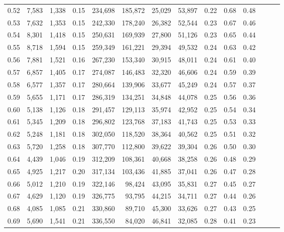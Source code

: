 \begin{tabular}{rrrrrrrrrrrrrr}
0.52 &   7,583 &  1,338 &  0.15 &  234,698 &  185,872 &  25,029 &  53,897 &  0.22 &  0.68 &      0.48 \\
0.53 &   7,632 &  1,353 &  0.15 &  242,330 &  178,240 &  26,382 &  52,544 &  0.23 &  0.67 &      0.46 \\
0.54 &   8,301 &  1,418 &  0.15 &  250,631 &  169,939 &  27,800 &  51,126 &  0.23 &  0.65 &      0.44 \\
0.55 &   8,718 &  1,594 &  0.15 &  259,349 &  161,221 &  29,394 &  49,532 &  0.24 &  0.63 &      0.42 \\
0.56 &   7,881 &  1,521 &  0.16 &  267,230 &  153,340 &  30,915 &  48,011 &  0.24 &  0.61 &      0.40 \\
0.57 &   6,857 &  1,405 &  0.17 &  274,087 &  146,483 &  32,320 &  46,606 &  0.24 &  0.59 &      0.39 \\
0.58 &   6,577 &  1,357 &  0.17 &  280,664 &  139,906 &  33,677 &  45,249 &  0.24 &  0.57 &      0.37 \\
0.59 &   5,655 &  1,171 &  0.17 &  286,319 &  134,251 &  34,848 &  44,078 &  0.25 &  0.56 &      0.36 \\
0.60 &   5,138 &  1,126 &  0.18 &  291,457 &  129,113 &  35,974 &  42,952 &  0.25 &  0.54 &      0.34 \\
0.61 &   5,345 &  1,209 &  0.18 &  296,802 &  123,768 &  37,183 &  41,743 &  0.25 &  0.53 &      0.33 \\
0.62 &   5,248 &  1,181 &  0.18 &  302,050 &  118,520 &  38,364 &  40,562 &  0.25 &  0.51 &      0.32 \\
0.63 &   5,720 &  1,258 &  0.18 &  307,770 &  112,800 &  39,622 &  39,304 &  0.26 &  0.50 &      0.30 \\
0.64 &   4,439 &  1,046 &  0.19 &  312,209 &  108,361 &  40,668 &  38,258 &  0.26 &  0.48 &      0.29 \\
0.65 &   4,925 &  1,217 &  0.20 &  317,134 &  103,436 &  41,885 &  37,041 &  0.26 &  0.47 &      0.28 \\
0.66 &   5,012 &  1,210 &  0.19 &  322,146 &   98,424 &  43,095 &  35,831 &  0.27 &  0.45 &      0.27 \\
0.67 &   4,629 &  1,120 &  0.19 &  326,775 &   93,795 &  44,215 &  34,711 &  0.27 &  0.44 &      0.26 \\
0.68 &   4,085 &  1,085 &  0.21 &  330,860 &   89,710 &  45,300 &  33,626 &  0.27 &  0.43 &      0.25 \\
0.69 &   5,690 &  1,541 &  0.21 &  336,550 &   84,020 &  46,841 &  32,085 &  0.28 &  0.41 &      0.23 \\

\end{tabular}
